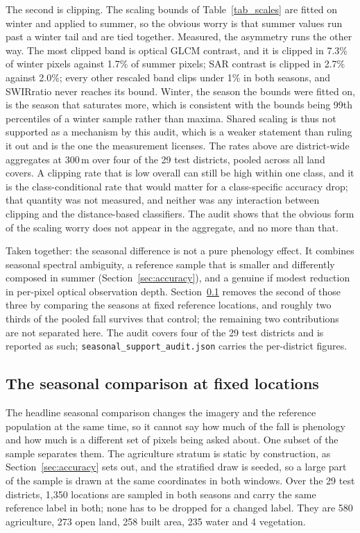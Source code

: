 \documentclass[conference]{IEEEtran}
\begin{document}
The second is clipping. The scaling bounds of Table~\ref{tab_scales} are fitted on winter and applied to summer, so the obvious worry is that summer values run past a winter tail and are tied together. Measured, the asymmetry runs the other way. The most clipped band is optical GLCM contrast, and it is clipped in 7.3\% of winter pixels against 1.7\% of summer pixels; SAR contrast is clipped in 2.7\% against 2.0\%; every other rescaled band clips under 1\% in both seasons, and SWIRratio never reaches its bound. Winter, the season the bounds were fitted on, is the season that saturates more, which is consistent with the bounds being 99th percentiles of a winter sample rather than maxima. Shared scaling is thus not supported as a mechanism by this audit, which is a weaker statement than ruling it out and is the one the measurement licenses. The rates above are district-wide aggregates at 300\,m over four of the 29 test districts, pooled across all land covers. A clipping rate that is low overall can still be high within one class, and it is the class-conditional rate that would matter for a class-specific accuracy drop; that quantity was not measured, and neither was any interaction between clipping and the distance-based classifiers. The audit shows that the obvious form of the scaling worry does not appear in the aggregate, and no more than that.

Taken together: the seasonal difference is not a pure phenology effect. It combines seasonal spectral ambiguity, a reference sample that is smaller and differently composed in summer (Section~\ref{sec:accuracy}), and a genuine if modest reduction in per-pixel optical observation depth. Section~\ref{sec:fixed} removes the second of those three by comparing the seasons at fixed reference locations, and roughly two thirds of the pooled fall survives that control; the remaining two contributions are not separated here. The audit covers four of the 29 test districts and is reported as such; \texttt{seasonal\_support\_audit.json} carries the per-district figures.

\subsection{The seasonal comparison at fixed locations}
\label{sec:fixed}
The headline seasonal comparison changes the imagery and the reference population at the same time, so it cannot say how much of the fall is phenology and how much is a different set of pixels being asked about. One subset of the sample separates them. The agriculture stratum is static by construction, as Section~\ref{sec:accuracy} sets out, and the stratified draw is seeded, so a large part of the sample is drawn at the same coordinates in both windows. Over the 29 test districts, 1{,}350 locations are sampled in both seasons and carry the same reference label in both; none has to be dropped for a changed label. They are 580 agriculture, 273 open land, 258 built area, 235 water and 4 vegetation.
\end{document}
